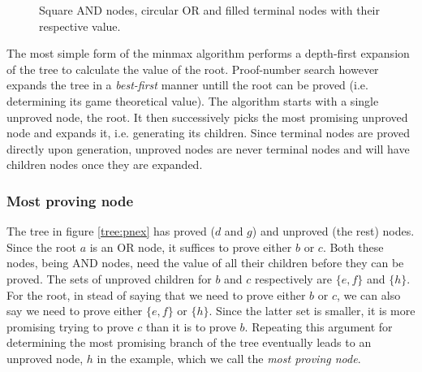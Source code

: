 \documentclass{article}
\begin{document}
\begin{figure}[h]
\center
{}
\caption{Square AND nodes, circular OR and filled terminal nodes with their respective value.}
\label{tree:simple}
\end{figure}

The most simple form of the minmax algorithm performs a depth-first expansion of the tree to calculate the value of the root. Proof-number search however
expands the tree in a \textit{best-first} manner untill the root can be proved (i.e. determining its game theoretical value). The algorithm starts with a single
unproved node, the root. It then successively picks the most promising unproved node and expands it, i.e. generating its children. Since terminal nodes are proved
directly upon generation, unproved nodes are never terminal nodes and will have children nodes once they are expanded. 

\subsubsection*{Most proving node}
The tree in figure \ref{tree:pnex} has proved ($d$ and $g$) and unproved (the rest) nodes. Since the root $a$ is an OR node, it suffices
to prove either $b$ or $c$. Both these nodes, being AND nodes, need the value of all their children before they can be proved. The sets of
unproved children for $b$ and $c$ respectively are $\{e, f\}$ and $\{h\}$. For the root, in stead of saying that we need to prove
either $b$ or $c$, we can also say we need to prove either $\{e, f\}$ or $\{h\}$. Since the latter set is smaller, it is more
promising trying to prove $c$ than it is to prove $b$. Repeating this argument for determining the most promising branch of the tree
eventually leads to an unproved node, $h$ in the example, which we call the \textit{most proving node}.
\end{document}
